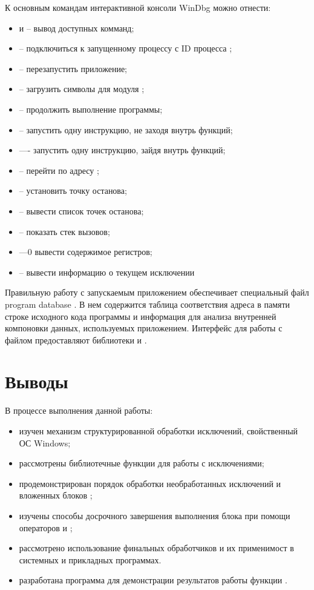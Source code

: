 К основным командам интерактивной консоли WinDbg можно отнести:
\begin{itemize}
	\item {} и  -- вывод доступных комманд;
	\item {} -- подключиться к запущенному процессу с ID процесса ;
	\item {} -- перезапустить приложение;
	\item {} -- загрузить символы для модуля ;
	\item {} -- продолжить выполнение программы;
	\item {} -- запустить одну инструкцию, не заходя внутрь функций;
	\item {} —- запустить одну инструкцию, зайдя внутрь функций;
	\item {} -- перейти по адресу ;
	\item {} -- установить точку останова;
	\item {} -- вывести список точек останова;
	\item {} -- показать стек вызовов;
	\item {} —0 вывести содержимое регистров;
	\item {} -- вывести информацию о текущем исключении
\end{itemize}

Правильную работу с запускаемым приложением обеспечивает специальный файл program database . В нем содержится таблица соответствия адреса в памяти строке исходного кода программы и информация для анализа внутренней компоновки данных, используемых приложением. Интерфейс для работы с файлом  предоставляют библиотеки  и .

\newpage

\section{Выводы}

В процессе выполнения данной работы:

\begin{itemize}
	\item изучен механизм структурированной обработки исключений, свойственный ОС Windows;
	\item рассмотрены библиотечные функции для работы с исключениями;
	\item продемонстрирован порядок обработки необработанных исключений и вложенных блоков ;
	\item изучены способы досрочного завершения выполнения блока  при помощи операторов  и ;
	\item рассмотрено использование финальных обработчиков  и их применимост в системных и прикладных программах.
	\item разработана программа для демонстрации результатов работы функции .
\end{itemize}

